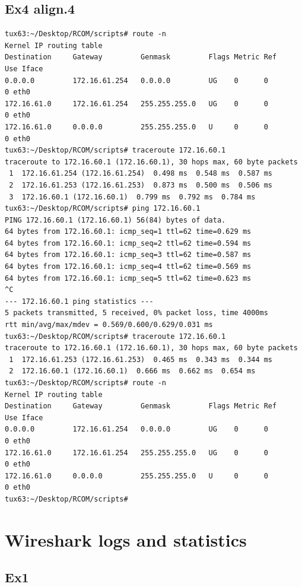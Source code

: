 \documentclass[11pt,a4paper,reqno]{report}
\numberwithin{equation}{section}
\begin{document}
\begin{appendices}
\section{Ex4 align.4}
\begin{lstlisting}[frame=single]
tux63:~/Desktop/RCOM/scripts# route -n
Kernel IP routing table
Destination     Gateway         Genmask         Flags Metric Ref    Use Iface
0.0.0.0         172.16.61.254   0.0.0.0         UG    0      0        0 eth0
172.16.61.0     172.16.61.254   255.255.255.0   UG    0      0        0 eth0
172.16.61.0     0.0.0.0         255.255.255.0   U     0      0        0 eth0
tux63:~/Desktop/RCOM/scripts# traceroute 172.16.60.1
traceroute to 172.16.60.1 (172.16.60.1), 30 hops max, 60 byte packets
 1  172.16.61.254 (172.16.61.254)  0.498 ms  0.548 ms  0.587 ms
 2  172.16.61.253 (172.16.61.253)  0.873 ms  0.500 ms  0.506 ms
 3  172.16.60.1 (172.16.60.1)  0.799 ms  0.792 ms  0.784 ms
tux63:~/Desktop/RCOM/scripts# ping 172.16.60.1
PING 172.16.60.1 (172.16.60.1) 56(84) bytes of data.
64 bytes from 172.16.60.1: icmp_seq=1 ttl=62 time=0.629 ms
64 bytes from 172.16.60.1: icmp_seq=2 ttl=62 time=0.594 ms
64 bytes from 172.16.60.1: icmp_seq=3 ttl=62 time=0.587 ms
64 bytes from 172.16.60.1: icmp_seq=4 ttl=62 time=0.569 ms
64 bytes from 172.16.60.1: icmp_seq=5 ttl=62 time=0.623 ms
^C
--- 172.16.60.1 ping statistics ---
5 packets transmitted, 5 received, 0% packet loss, time 4000ms
rtt min/avg/max/mdev = 0.569/0.600/0.629/0.031 ms
tux63:~/Desktop/RCOM/scripts# traceroute 172.16.60.1
traceroute to 172.16.60.1 (172.16.60.1), 30 hops max, 60 byte packets
 1  172.16.61.253 (172.16.61.253)  0.465 ms  0.343 ms  0.344 ms
 2  172.16.60.1 (172.16.60.1)  0.666 ms  0.662 ms  0.654 ms
tux63:~/Desktop/RCOM/scripts# route -n
Kernel IP routing table
Destination     Gateway         Genmask         Flags Metric Ref    Use Iface
0.0.0.0         172.16.61.254   0.0.0.0         UG    0      0        0 eth0
172.16.61.0     172.16.61.254   255.255.255.0   UG    0      0        0 eth0
172.16.61.0     0.0.0.0         255.255.255.0   U     0      0        0 eth0
tux63:~/Desktop/RCOM/scripts# 
\end{lstlisting}

\chapter{Wireshark logs and statistics}

\section{Ex1}
\label{ex1_headers}

\end{appendices}
\end{document}
